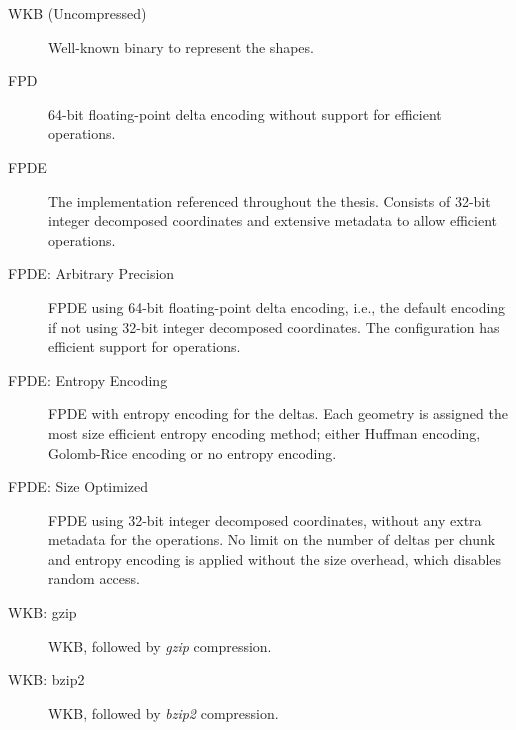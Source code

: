 \begin{description}
     \item [WKB (Uncompressed)] Well-known binary to represent the shapes.
     
    \item [FPD] 64-bit floating-point delta encoding without support for efficient operations.

    \item [FPDE] The implementation referenced throughout the thesis. Consists of 32-bit integer decomposed coordinates and extensive metadata to allow efficient operations.
    
    \item [FPDE: Arbitrary Precision] FPDE using 64-bit floating-point delta encoding, i.e., the default encoding if not using 32-bit integer decomposed coordinates. The configuration has efficient support for operations.

    \item [FPDE: Entropy Encoding] FPDE with entropy encoding for the deltas. Each geometry is assigned the most size efficient entropy encoding method; either Huffman encoding, Golomb-Rice encoding or no entropy encoding.

    \item [FPDE: Size Optimized] FPDE using 32-bit integer decomposed coordinates, without any extra metadata for the operations. No limit on the number of deltas per chunk and entropy encoding is applied without the size overhead, which disables random access.

    \item [WKB: gzip] WKB, followed by \textit{gzip} compression.
    
    \item [WKB: bzip2] WKB, followed by \textit{bzip2} compression.
\end{description}

